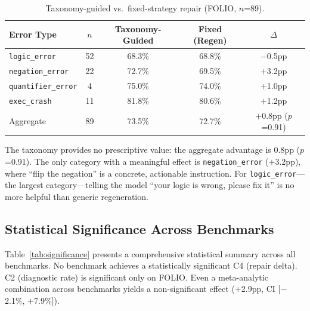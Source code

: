 \documentclass[11pt]{article}
\begin{document}
\begin{table}[t]
\centering
\caption{Taxonomy-guided vs.\ fixed-strategy repair (FOLIO, $n$=89).}
\label{tab:taxonomy_repair}
\begin{tabular}{lcccc}
\toprule
Error Type & $n$ & Taxonomy-Guided & Fixed (Regen) & $\Delta$ \\
\midrule
\texttt{logic\_error}      & 52 & 68.3\% & 68.8\% & $-$0.5pp \\
\texttt{negation\_error}   & 22 & 72.7\% & 69.5\% & $+$3.2pp \\
\texttt{quantifier\_error} & 4  & 75.0\% & 74.0\% & $+$1.0pp \\
\texttt{exec\_crash}       & 11 & 81.8\% & 80.6\% & $+$1.2pp \\
\midrule
Aggregate & 89 & 73.5\% & 72.7\% & $+$0.8pp ($p$=0.91) \\
\bottomrule
\end{tabular}
\end{table}

The taxonomy provides no prescriptive value: the aggregate advantage is 0.8pp ($p$=0.91). The only category with a meaningful effect is \texttt{negation\_error} ($+$3.2pp), where ``flip the negation'' is a concrete, actionable instruction. For \texttt{logic\_error}---the largest category---telling the model ``your logic is wrong, please fix it'' is no more helpful than generic regeneration.

\subsection{Statistical Significance Across Benchmarks}

Table~\ref{tab:significance} presents a comprehensive statistical summary across all benchmarks. No benchmark achieves a statistically significant C4 (repair delta). C2 (diagnostic rate) is significant only on FOLIO. Even a meta-analytic combination across benchmarks yields a non-significant effect ($+$2.9pp, CI [$-$2.1\%, $+$7.9\%]).
\end{document}
